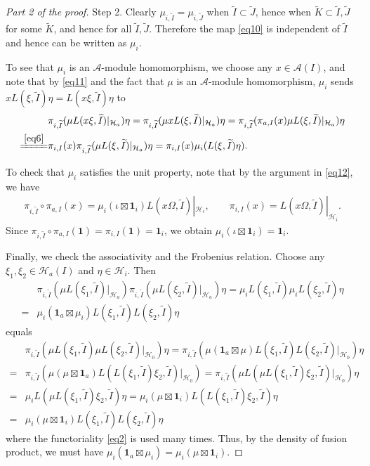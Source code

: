 \documentclass[12pt,a4paper,notitlepage]{article}
\theoremstyle{definition}
\theoremstyle{plain}
\newcommand{\mc}{\mathcal}
\newcommand{\wtd}{\widetilde}
\newcommand{\id}{\mathbf{1}}
\numberwithin{equation}{section}
\begin{document}
\begin{proof}[Part 2 of the proof]
Step 2. Clearly $\mu_{i,\wtd I}=\mu_{i,\wtd J}$ when $\wtd I\subset \wtd J$, hence when $\wtd K\subset\wtd I,\wtd J$ for some $\wtd K$, and hence for all $\wtd I,\wtd J$. Therefore the map \eqref{eq10} is independent of  $\wtd I$ and hence can be written as $\mu_{i}$.

To see that $\mu_i$ is an $\mc A$-module homomorphism, we choose any $x\in\mc A(I)$, and note that by \eqref{eq11} and the fact that $\mu$ is an $\mc A$-module homomorphism, $\mu_i$ sends $xL(\xi,\wtd I)\eta=L(x\xi,\wtd I)\eta$ to
\begin{align*}
&\pi_{i,\wtd I}(\mu L(x\xi,\wtd I)|_{\mc H_a})\eta=\pi_{i,\wtd I}(\mu xL(\xi,\wtd I)|_{\mc H_a})\eta=\pi_{i,\wtd I}(\pi_{a,I}(x)\mu L(\xi,\wtd I)|_{\mc H_a})\eta\\
\xlongequal{\eqref{eq6}}&\pi_{i,I}(x)\pi_{i,\wtd I}(\mu L(\xi,\wtd I)|_{\mc H_a})\eta=\pi_{i,I}(x)\mu_i(L(\xi,\wtd I)\eta).
\end{align*}

To check that $\mu_i$ satisfies the unit property, note that by the argument in \eqref{eq12}, we have
\begin{align*}
\pi_{i,\wtd I}\circ\pi_{a,I}(x)=\mu_i(\iota\boxtimes \id_i) L(x\Omega,\wtd I)|_{\mc H_i},\qquad \pi_{i,I}(x)=L(x\Omega,\wtd I)|_{\mc H_i}.
\end{align*}
Since $\pi_{i,\wtd I}\circ\pi_{a,I}(\id)=\pi_{i,I}(\id)=\id_i$, we obtain $\mu_i(\iota\boxtimes \id_i)=\id_i$.


Finally, we check the associativity and the Frobenius relation. Choose any $\xi_1,\xi_2\in\mc H_a(I)$ and $\eta\in\mc H_i$. Then
\begin{align*}
&\pi_{i,\wtd I}(\mu L(\xi_1,\wtd I)|_{\mc H_a})\pi_{i,\wtd I}(\mu L(\xi_2,\wtd I)|_{\mc H_a})\eta=\mu_i L(\xi_1,\wtd I)\mu_i L(\xi_2,\wtd I)\eta\\
=&\mu_i(\id_a\boxtimes\mu_i)L(\xi_1,\wtd I)L(\xi_2,\wtd I)\eta	
\end{align*}
equals
\begin{align*}
&\pi_{i,\wtd I}(\mu L(\xi_1,\wtd I)\mu L(\xi_2,\wtd I)|_{\mc H_0})\eta=\pi_{i,\wtd I}(\mu(\id_a\boxtimes\mu) L(\xi_1,\wtd I) L(\xi_2,\wtd I)|_{\mc H_0})\eta\\
=& \pi_{i,\wtd I}(\mu(\mu\boxtimes\id_a) L(L(\xi_1,\wtd I)\xi_2,\wtd I)|_{\mc H_0})	=\pi_{i,\wtd I}(\mu L(\mu L(\xi_1,\wtd I)\xi_2,\wtd I)|_{\mc H_0})\eta\\
=&\mu_i L(\mu L(\xi_1,\wtd I)\xi_2,\wtd I)\eta=\mu_i(\mu\boxtimes \id_i) L(L(\xi_1,\wtd I)\xi_2,\wtd I)\eta\\
=&\mu_i(\mu\boxtimes \id_i) L(\xi_1,\wtd I)L(\xi_2,\wtd I)\eta
\end{align*}
where the functoriality \eqref{eq2} is used many times. Thus, by the density of fusion product, we must have $\mu_i(\id_a\boxtimes\mu_i)=\mu_i(\mu\boxtimes\id_i)$.


\end{proof}
\end{document}
